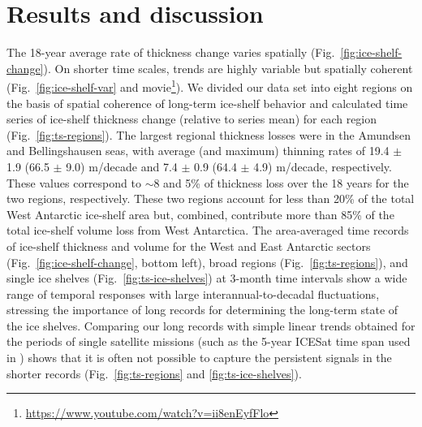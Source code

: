 \section{Results and discussion}

\noindent
The 18-year average rate of thickness change varies spatially (Fig.~\ref{fig:ice-shelf-change}).
On shorter time scales, trends are highly variable but spatially coherent
(Fig.~\ref{fig:ice-shelf-var} and movie\footnote{\url{https://www.youtube.com/watch?v=ii8enEyfFlo}}). We divided our data set into eight regions on the basis of spatial coherence of long-term
ice-shelf behavior and calculated time series of ice-shelf thickness change
(relative to series mean) for each region (Fig.~\ref{fig:ts-regions}). The largest regional
thickness losses were in the Amundsen and Bellingshausen seas, with average
(and maximum) thinning rates of 19.4 $\pm$ 1.9 (66.5 $\pm$ 9.0) m/decade and
7.4 $\pm$ 0.9 (64.4 $\pm$ 4.9) m/decade, respectively. These values correspond
to $\sim$8 and 5\% of thickness loss over the 18 years for the two regions,
respectively. These two regions account for less than 20\% of the total West
Antarctic ice-shelf area but, combined, contribute more than 85\% of the total
ice-shelf volume loss from West Antarctica. The area-averaged time records of
ice-shelf thickness and volume for the West and East Antarctic sectors 
(Fig.~\ref{fig:ice-shelf-change}, bottom left), broad regions (Fig.~\ref{fig:ts-regions}), and single ice
shelves (Fig.~\ref{fig:ts-ice-shelves}) at 3-month time intervals show a wide range of
temporal responses with large interannual-to-decadal fluctuations, stressing
the importance of long records for determining the long-term state of the ice
shelves. Comparing our long records with simple linear trends obtained for the
periods of single satellite missions (such as the 5-year ICESat time span used
in \textcite{Pritchard2012}) shows that it is often not possible to capture the
persistent signals in the shorter records (Fig.~\ref{fig:ts-regions} and \ref{fig:ts-ice-shelves}).


